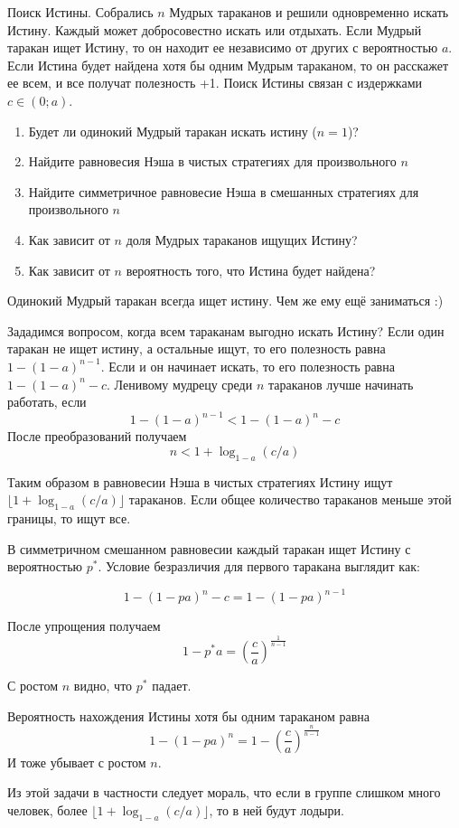 \begin{problem} 
Поиск Истины.
Собрались $n$ Мудрых тараканов и решили одновременно искать Истину. Каждый может добросовестно искать или отдыхать. Если Мудрый таракан ищет Истину, то он находит ее независимо от других с вероятностью $a$. Если Истина будет найдена хотя бы одним Мудрым тараканом, то он расскажет ее всем, и все получат полезность +1. Поиск Истины связан с издержками $c\in(0;a)$. 
\begin{enumerate}
\item Будет ли одинокий Мудрый таракан искать истину ($n=1$)? 
\item Найдите равновесия Нэша в чистых стратегиях для произвольного $n$ 
\item Найдите симметричное равновесие Нэша в смешанных стратегиях для произвольного $n$ 
\item Как зависит от $n$ доля Мудрых тараканов ищущих Истину? 
\item Как зависит от $n$ вероятность того, что Истина будет найдена? 
\end{enumerate}
\end{problem}

\begin{solution}
Одинокий Мудрый таракан всегда ищет истину. Чем же ему ещё заниматься :)

Зададимся вопросом, когда всем тараканам выгодно искать Истину?
Если один таракан не ищет истину, а остальные ищут, то его полезность равна $1-(1-a)^{n-1}$. Если и он начинает искать, то его полезность равна $1-(1-a)^n-c$. Ленивому мудрецу среди $n$ тараканов лучше начинать работать, если 
\[
1-(1-a)^{n-1} < 1-(1-a)^n-c
\]
После преобразований получаем
\[
n< 1 + \log_{1-a}(c/a)
\]

Таким образом в равновесии Нэша в чистых стратегиях Истину ищут $\lfloor 1 + \log_{1-a}(c/a) \rfloor$ тараканов. Если общее количество тараканов меньше этой границы, то ищут все.

В симметричном смешанном равновесии каждый таракан ищет Истину с вероятностью $p^*$.  Условие безразличия для первого таракана выглядит как:

\[
1-(1-pa)^n-c=1-(1-pa)^{n-1}
\]

После упрощения получаем
\[
1-p^{*}a=\left(\frac{c}{a}\right)^{\frac{1}{n-1}}
\]

С ростом $n$ видно, что $p^*$ падает.

Вероятность нахождения Истины хотя бы одним тараканом равна
\[
1-(1-pa)^n=1-\left(\frac{c}{a}\right)^{\frac{n}{n-1}}
\]
И тоже убывает с ростом $n$.

Из этой задачи в частности следует мораль, что если в группе слишком много человек, более $\lfloor 1 + \log_{1-a}(c/a) \rfloor$, то в ней будут лодыри.

\end{solution}

